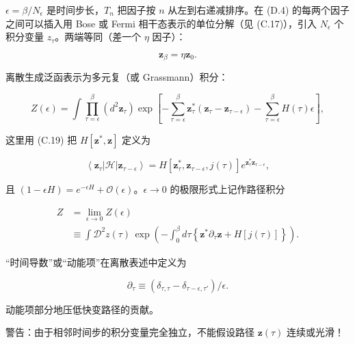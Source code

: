 $\epsilon = \beta/N_{\epsilon}$ 是时间步长，$T_{n}$ 把因子按 $n$ 从左到右递减排序。在 (D.4) 的每两个因子之间可以插入用 Bose 或 Fermi 相干态表示的单位分解（见 (C.17)），引入 $N_{\epsilon}$ 个积分变量 $z_{\tau}$。两端等同（差一个 $\eta$ 因子）：

\begin{equation*}
\mathbf {z} _ {\beta} = \eta \mathbf {z} _ {0}.
\tag{D.5}
\end{equation*}

离散生成泛函表示为多元复（或 Grassmann）积分：

\begin{equation*}
Z ( \epsilon ) = \int \prod_{\tau = \epsilon} ^ {\beta} \left( d ^ {2} \mathbf {z} _ {\tau} \right) \exp \left[ - \sum_{\tau = \epsilon} ^ {\beta} \mathbf {z} _ {\tau} ^ {*} \left( \mathbf {z} _ {\tau} - \mathbf {z}_{\tau - \epsilon} \right) - \sum_{\tau = \epsilon} ^ {\beta} H ( \tau ) \epsilon \right] ,
\tag{D.6}
\end{equation*}

这里用 (C.19) 把 $H[\mathbf{z}^*,\mathbf{z}]$ 定义为

\begin{equation*}
\left\langle \mathbf {z} _ {\tau} \left| \mathcal {H} \right| \mathbf {z}_{\tau - \epsilon} \right\rangle = H \left[ \mathbf {z} _ {\tau} ^ {*}, \mathbf {z}_{\tau - \epsilon}, j ( \tau ) \right] e ^ {\mathbf {z} _ {\tau} ^ {*} \mathbf {z}_{\tau - \epsilon}} ,
\tag{D.7}
\end{equation*}

且 $(1 - \epsilon H) = e^{-\epsilon H} + \mathcal{O}(\epsilon)$。$\epsilon \to 0$ 的极限形式上记作路径积分

\begin{align*}
Z & = \lim_{\epsilon \to 0} Z ( \epsilon )\\
& \equiv \int \mathcal {D} ^ {2} z ( \tau ) \, \exp \left( - \int_ {0} ^ {\beta} d \tau \left\{ \mathbf {z} ^ {*} \partial_ {\tau} \mathbf {z} + H [ j ( \tau ) ] \right\} \right).
\tag{D.8}
\end{align*}

“时间导数”或“动能项”在离散表述中定义为

\begin{equation*}
\partial_ {\tau} \equiv \left( \delta_{\tau, \tau} - \delta_{\tau - \epsilon, \tau '} \right) / \epsilon .
\tag{D.9}
\end{equation*}

动能项部分地压低快变路径的贡献。

警告：由于相邻时间步的积分变量完全独立，不能假设路径 $\mathbf{z}(\tau)$ 连续或光滑！

